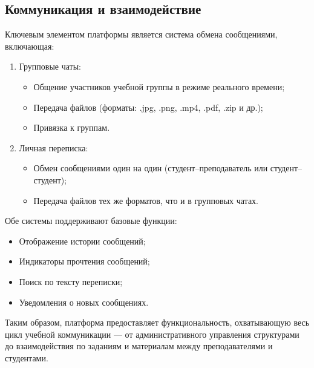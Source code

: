 \subsection{Коммуникация и взаимодействие}

Ключевым элементом платформы является система обмена сообщениями, включающая:
\begin{enumerate}
  \item Групповые чаты:
    \begin{itemize}
      \item Общение участников учебной группы в режиме реального времени;
      \item Передача файлов (форматы: .jpg, .png, .mp4, .pdf, .zip и др.);
      \item Привязка к группам.
    \end{itemize}
  \item Личная переписка:
    \begin{itemize}
      \item Обмен сообщениями один на один (студент–преподаватель или студент–студент);
      \item Передача файлов тех же форматов, что и в групповых чатах.
    \end{itemize}
\end{enumerate}

Обе системы поддерживают базовые функции:
\begin{itemize}
  \item Отображение истории сообщений;
  \item Индикаторы прочтения сообщений;
  \item Поиск по тексту переписки;
  \item Уведомления о новых сообщениях.
\end{itemize}

Таким образом, платформа предоставляет функциональность, охватывающую весь цикл учебной коммуникации — от административного управления структурами до взаимодействия по заданиям и материалам между преподавателями и студентами.
